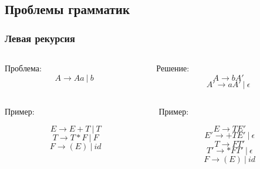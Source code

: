\documentclass[xetex,mathserif,serif]{beamer}
\begin{document}
    \subsection{Проблемы грамматик}

    \begin{frame}
        \frametitle{Левая рекурсия}
        \begin{columns}[t]
            \begin{column}{0.5\textwidth}
                Проблема:
                $$A \rightarrow Aa\ |\ b$$
            \end{column}
            \begin{column}{0.5\textwidth}
                Решение: 
                $$A \rightarrow bA'$$
                $$A' \rightarrow aA'\ |\ \epsilon$$
            \end{column}
        \end{columns}
        \begin{columns}[t]
            \begin{column}{0.5\textwidth}
                Пример:
                
                $$E \rightarrow E + T\ |\ T$$
                $$T \rightarrow T * F\ |\ F$$
                $$F \rightarrow (E)\ |\ id$$
            \end{column}
            \begin{column}{0.5\textwidth}
                Пример:

                $$E \rightarrow TE'$$
                $$E' \rightarrow +TE'\ |\ \epsilon$$
                $$T \rightarrow FT'$$
                $$T' \rightarrow *FT'\ |\ \epsilon$$
                $$F \rightarrow (E)\ |\ id$$
            \end{column}
        \end{columns}
    \end{frame}
\end{document}
